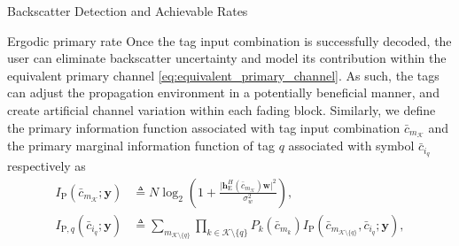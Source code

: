 \documentclass[journal]{IEEEtran}
\begin{document}
\begin{section}{Backscatter Detection and Achievable Rates}
		\begin{subsection}{Ergodic primary rate}
			Once the tag input combination is successfully decoded, the user can eliminate backscatter uncertainty and model its contribution within the equivalent primary channel \eqref{eq:equivalent_primary_channel}. As such, the tags can adjust the propagation environment in a potentially beneficial manner, and create artificial channel variation within each fading block. Similarly, we define the primary information function associated with tag input combination $\bar{c}_{m_{\mathcal{K}}}$ and the primary marginal information function of tag $q$ associated with symbol $\bar{c}_{i_q}$ respectively as
			\begin{align}
				I_{\mathrm{P}}(\bar{c}_{m_{\mathcal{K}}};\boldsymbol{y})
				& \triangleq N \log_2 \left(1 + \frac{\lvert \boldsymbol{h}_{\mathrm{E}}^H(\bar{c}_{m_{\mathcal{K}}}) \boldsymbol{w} \rvert^2}{\sigma_w^2}\right),\label{eq:primary_information_function}\\
				I_{\mathrm{P},q}(\bar{c}_{i_q};\boldsymbol{y})
				& \triangleq \sum_{m_{\mathcal{K} \setminus \{q\}}} \prod_{k \in \mathcal{K} \setminus \{q\}} P_{k}(\bar{c}_{m_{k}}) I_{\mathrm{P}}(\bar{c}_{m_{\mathcal{K} \setminus \{q\}}},\bar{c}_{i_q};\boldsymbol{y}),\label{eq:primary_marginal_information_function}
			\end{align}

\end{subsection}
\end{section}
\end{document}
